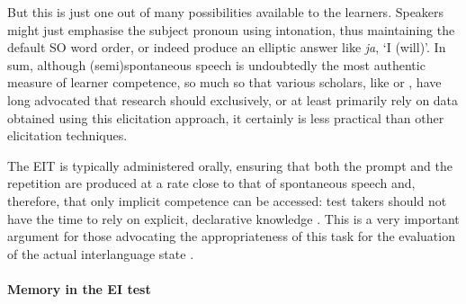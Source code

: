 But this is just one out of many possibilities available to the learners. Speakers might just emphasise the subject pronoun using intonation, thus maintaining the default SO word order, or indeed produce an elliptic answer like \textit{ja}, ‘I (will)’. In sum, although (semi)spontaneous speech is undoubtedly the most authentic \citep{Lewkowicz2000} measure of learner competence, so much so that various scholars, like \citet{Pienemann1998} or \citet{Krashen1981}, have long advocated that research should exclusively, or at least primarily rely on data obtained using this elicitation approach, it certainly is less practical than other elicitation techniques.

The EIT is typically administered orally, ensuring that both the prompt and the repetition are produced at a rate close to that of spontaneous speech and, therefore, that only implicit competence can be accessed: test takers should not have the time to rely on explicit, declarative knowledge \citep{Ellis2005}. This is a very important argument for those advocating the appropriateness of this task for the evaluation of the actual interlanguage state \citep{Erlam2006}.

\paragraph{Memory in the EI test}

